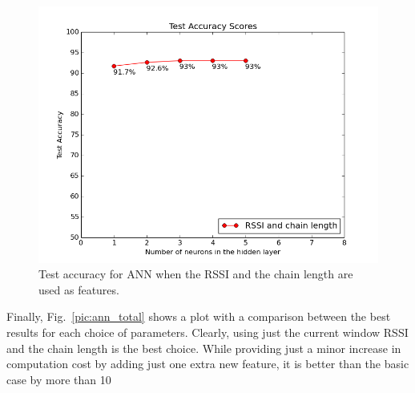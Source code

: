 \begin{figure}[h]
	\begin{center}
		\includegraphics[scale=0.5]{figures/ann_chain.png}
	\end{center}
	
	\caption{Test accuracy for ANN when the RSSI and the chain length are used as features.}
	\label{pic:ann_chain}

\end{figure}

Finally, Fig.~\ref{pic:ann_total} shows a plot with a comparison between the best results for each choice of parameters. Clearly, using just the current window RSSI and the chain length is the best choice. While providing just a minor increase in computation cost by adding just one extra new feature, it is better than the basic case by more than 10%

